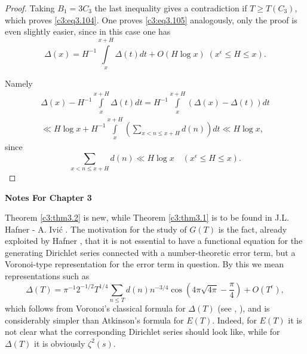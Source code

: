 \begin{proof}
Taking $B_1 = 3 C_3$ the last inequality gives a contradiction if $T
\geq T(C_3)$, which proves \eqref{c3:eq3.104}. One proves
\eqref{c3:eq3.105} analogously, only the proof is even slightly
easier, since in this case one has
\begin{equation}
  \Delta(x) = H^{-1}\int\limits_x^{x+H} \Delta (t) dt + O(H \log x) \; 
  (x^\epsilon \leq H \leq x).\label{c3:eq3.107}
\end{equation}

Namely
\begin{multline*}
  \Delta(x) - H^{-1} \int\limits_x^{x + H} \Delta(t) dt = H^{-1}
  \int\limits_x^{x+H} (\Delta(x) - \Delta(t)) dt\\
  \ll H \log x + H^{-1} \int\limits_x^{x+H} \left(\sum_{x < n \leq x
    +H} d(n) \right) dt \ll H \log x,
\end{multline*}
since\pageoriginale
\begin{equation}
  \sum_{x < n \leq x+H} d(n) \ll H \log x \quad (x^\epsilon \leq H
  \leq x).\label{c3:eq3.108}
\end{equation}
\end{proof}

\bigskip
\begin{center}
  \textbf{\Large Notes For Chapter 3}
\end{center}
\medskip

Theorem \ref{c3:thm3.2} is new, while Theorem \ref{c3:thm3.1} is to be
found in J.L. Hafner - A. Ivi\'c \cite{Hafner and Ivic1}. The motivation for the
study of $G(T)$ is the fact, already exploited by Hafner \cite{Hafner3},
that it is not essential to have a functional equation for the
generating Dirichlet series connected with a number-theoretic error
term, but a Voronoi-type representation for the error term in
question. By this we mean representations such as 
$$
\Delta(T) = \pi^{-1} 2^{-1/2} T^{1/4} \sum_{n \leq T} d(n) n^{-3/4}
\cos \left(4 \pi \sqrt{4 \pi}- \frac{\pi}{4} \right) + O(T^\epsilon),
$$
which follows from Voronoi's classical formula for $\Delta(T)$ (see
\cite{Voronoi1}, \cite{Voronoi2}), and is considerably simpler than Atkinson's
formula for $E(T)$. Indeed, for $E(T)$ it is not clear what the
corresponding Dirichlet series should look like, while for $\Delta
(T)$ it is obviously $\zeta^2 (s)$.

